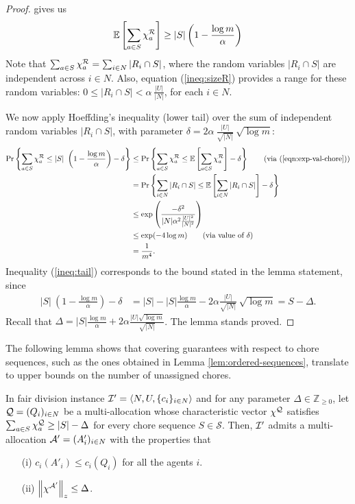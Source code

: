 \begin{proof}
     gives us 
    \begin{align}
        \mathbb{E}\left[\sum_{a\in S}\chi^{\mathcal{R}}_a\right]\geq|S|  \left(1-\frac{\log m}{\alpha}\right) \label{eqn:exp-val-chore}
    \end{align} 
Note that $\sum_{a\in S}\chi^{\mathcal{R}}_a=\sum_{i\in N}|R_i\cap S|$, where the random variables $|R_i\cap S|$ are independent across $i \in N$. Also, equation (\ref{ineq:sizeR}) provides a range for these random variables: $0\leq |R_i\cap S| <  \alpha\ \frac{|U|}{|N|}$, for each $i \in N$.
    
We now apply Hoeffding's inequality (lower tail) over the sum of independent random variables $|R_i\cap S|$, with parameter $\delta=2\alpha\ \frac{|U|}{\sqrt{|N|}}\ \sqrt{\log m}$:  
\begin{align}
\prob{\sum_{a\in S}\chi^\calR_a \leq|S|\ \left(1-\frac{\log m}{\alpha}\right)-\delta}
    &\leq \prob{\sum_{a\in S}\chi^\calR_a \leq \expval{\sum_{a\in S}\chi^\calR_a}-\delta} \tag{via (\ref{eqn:exp-val-chore})}\\
    & = \prob{ \sum_{i\in N}|R_i\cap S| \leq \expval{\sum_{i\in N}|R_i\cap S|}-\delta} \nonumber \\ 
    & \leq \exp \left( \frac{- \delta^2}{|N| \alpha^2 \frac{|U|^2}{|N|^2} } \right) \nonumber \\ 
    &\leq \exp(-4\log m) \tag{via value of $\delta$} \\
    &=\frac{1}{m^4} \label{ineq:tail}.
\end{align} 
    Inequality (\ref{ineq:tail}) corresponds to the bound stated in the lemma statement, since
    \begin{align*}
    |S|\ \left(1-\frac{\log m}{\alpha}\right)-\delta &= |S| - |S| \frac{\log m}{\alpha} - 2\alpha \frac{|U|}{\sqrt{|N|}}\ \sqrt{\log m} 
    = S-\Delta.
    \end{align*}
    Recall that $\Delta=|S|\frac{\log m}{\alpha} +2\alpha \frac{|U| \sqrt{\log m}}{\sqrt{|N|}}$. The lemma stands proved. 
\end{proof}

The following lemma shows that covering guarantees with respect to chore sequences, such as the ones obtained in Lemma \ref{lem:ordered-sequences}, translate to upper bounds on the number of unassigned chores. 

\begin{lemma}
\label{lem:shifting_chores}
In fair division instance $\mathcal{I}'=\langle N,U,\{c_i\}_{i\in N}\rangle$ and for any parameter $\Delta\in \mathbb{Z}_{\geq 0}$, let $\mathcal{Q}=(Q_i)_{i \in N}$ be a multi-allocation whose characteristic vector $\chi^{\mathcal{Q}}$ satisfies $\sum_{a\in S} \chi^{\mathcal{Q}}_a\geq |S|-\Delta$ for every chore sequence $S\in\mathcal{S}$. Then, $\mathcal{I}'$ admits a multi-allocation $\mathcal{A}'=(A'_i)_{i \in N}$ with the properties that 
\begin{itemize}
        \item[(i)] $c_i(A'_i)\leq c_i(Q_i)$ for all the agents $i$.
        \item[(ii)] $\left\|\chi^{\mathcal{A}'}\right\|_z \leq \Delta$.
    \end{itemize}
\end{lemma}


